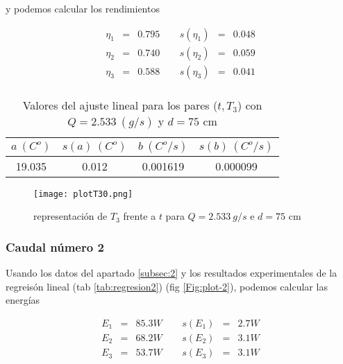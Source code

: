 \documentclass[12pt,a4paper]{article}
\begin{document}
 y podemos calcular los rendimientos 
 
\begin{equation} 
\begin{array}{lllllll}
\eta_1 & = & 0.795  &  \ \ &  s(\eta_1) & =  & 0.048   \\ 
 \eta_2 & = & 0.740  &  \ \ &  s(\eta_2) & =  & 0.059   \\ 
 \eta_3 & = & 0.588  &  \ \ &  s(\eta_3) & =  & 0.041   \\ 
 \end{array} 
\end{equation} 
 
 \begin{table}[h!] 	 \centering 
\begin{tabular}{|c|c|c|c|} 
\hline 
$a \ (C^o)$ & $s(a) \ (C^o)$ & $ b \ (C^o/s)$ & $s(b) \ (C^o/s)$  \\ \hline 
19.035  & 0.012 &  0.001619 & 0.000099 \\ 
\hline
\end{tabular} 
\caption{Valores del ajuste lineal para los pares ($t,T_3$) con $Q=2.533 \ (g/s)$ y $d= 75 $ cm} 
\label{tab:regresion1} 
\end{table} 
 
 
\begin{figure}[h!] 	 \centering 
\texttt{[image: plotT30.png]} 
\caption{representación de $T_3$ frente a $t$ para $Q = 2.533 \ g/s$ e $d = 75$ cm} 
\label{Fig:plot-1}  
\end{figure} 
 
\newpage 
 
 
 
 
\subsubsection{Caudal número 2} 
 
Usando los datos del apartado \ref{subsec:2} y los  resultados experimentales de la regreisón lineal (tab \ref{tab:regresion2}) (fig \ref{Fig:plot-2}), podemos calcular las energías 
 
 \begin{equation} 
\begin{array}{lllllll}
E_1 & = & 85.3 W &  \ \ &  s(E_1) & =  & 2.7  W \\ 
 E_2 & = & 68.2 W &  \ \ &  s(E_2) & =  & 3.1  W \\ 
 E_3 & = & 53.7 W &  \ \ &  s(E_3) & =  & 3.1  W \\ 
 \end{array} 
\end{equation} 
 
\end{document}
